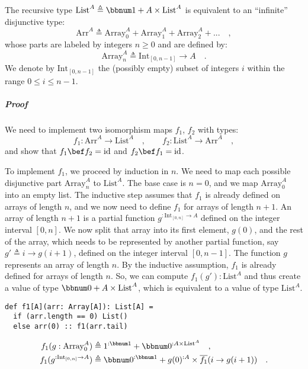 The recursive type $\text{List}^{A}\triangleq\bbnum 1+A\times\text{List}^{A}$
is equivalent to an \textsf{``}infinite\textsf{''} disjunctive type:
\[
\text{Arr}^{A}\triangleq\text{Array}_{0}^{A}+\text{Array}_{1}^{A}+\text{Array}_{2}^{A}+...\quad,
\]
whose parts are labeled by integers $n\ge0$ and are defined by:
\[
\text{Array}_{n}^{A}\triangleq\text{Int}_{[0,n-1]}\rightarrow A\quad.
\]
 We denote by $\text{Int}_{[0,n-1]}$ the (possibly empty) subset
of integers $i$ within the range $0\leq i\leq n-1$.

\subparagraph{Proof}

We need to implement two isomorphism maps $f_{1}$, $f_{2}$ with
types:
\[
f_{1}:\text{Arr}^{A}\rightarrow\text{List}^{A}\quad,\quad\quad f_{2}:\text{List}^{A}\rightarrow\text{Arr}^{A}\quad,
\]
and show that $f_{1}\bef f_{2}=\text{id}$ and $f_{2}\bef f_{1}=\text{id}$.

To implement $f_{1}$, we proceed by induction in $n$. We need to
map each possible disjunctive part $\text{Array}_{n}^{A}$ to $\text{List}^{A}$.
The base case is $n=0$, and we map $\text{Array}_{0}^{A}$ into an
empty list. The inductive step assumes that $f_{1}$ is already defined
on arrays of length $n$, and we now need to define $f_{1}$ for arrays
of length $n+1$. An array of length $n+1$ is a partial function
$g^{:\text{Int}_{[0,n]}\rightarrow A}$ defined on the integer interval
$[0,n]$. We now split that array into its first element, $g(0)$,
and the rest of the array, which needs to be represented by another
partial function, say $g'\triangleq i\rightarrow g(i+1)$, defined
on the integer interval $[0,n-1]$. The function $g$ represents an
array of length $n$. By the inductive assumption, $f_{1}$ is already
defined for arrays of length $n$. So, we can compute $f_{1}(g'):\text{List}^{A}$
and thus create a value of type $\bbnum 0+A\times\text{List}^{A}$,
which is equivalent to a value of type $\text{List}^{A}$.
\begin{lstlisting}
def f1[A](arr: Array[A]): List[A] =
  if (arr.length == 0) List()
  else arr(0) :: f1(arr.tail)
\end{lstlisting}
\begin{align*}
f_{1}(g:\text{Array}_{0}^{A}) & \triangleq1^{:\bbnum 1}+\bbnum 0^{:A\times\text{List}^{A}}\quad,\\
f_{1}(g^{:\text{Int}_{[0,n]}\rightarrow A}) & \triangleq\bbnum 0^{:\bbnum 1}+g(0)^{:A}\times\overline{f_{1}}(i\rightarrow g(i+1))\quad.
\end{align*}

